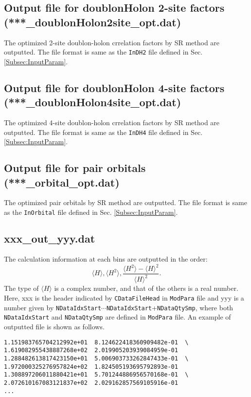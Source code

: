 \subsection{Output file for doublonHolon 2-site factors \\(***\_doublonHolon2site\_opt.dat)}
The optimized 2-site doublon-holon crrelation factors  by SR method are outputted. The file format is same as the \verb|InDH2| file defined in Sec. \ref{Subsec:InputParam}.

\subsection{Output file for doublonHolon 4-site factors \\(***\_doublonHolon4site\_opt.dat)}
The optimized 4-site doublon-holon crrelation factors  by SR method are outputted. The file format is same as the \verb|InDH4| file defined in Sec. \ref{Subsec:InputParam}.

\subsection{Output file for pair orbitals \\(***\_orbital\_opt.dat)}
The optimized pair orbitals by SR method are outputted. The file format is same as the \verb|InOrbital| file defined in Sec. \ref{Subsec:InputParam}.

\subsection{xxx\_out\_yyy.dat}
The calculation information at each bins are outputted in the order:
\begin{equation}
\langle H \rangle, \langle H^2 \rangle, \frac{\langle H^2 \rangle- \langle H \rangle^2 }{\langle H \rangle^2} \nonumber.
\end{equation}
The type of $\langle H \rangle$ is a complex number, and that of the others is a real number.
Here, xxx is the header indicated by \verb|CDataFileHead| in \verb|ModPara| file and yyy is a number given by \verb|NDataIdxStart|$\cdots$\verb|NDataIdxStart|+\verb|NDataQtySmp|, where both \verb|NDataIdxStart| and \verb|NDataQtySmp| are defined in \verb|ModPara| file.
An example of outputted file is shown as follows.

\begin{minipage}{13cm}
\begin{screen}
\begin{verbatim}
1.151983765704212992e+01  8.124622418360909482e-01  \
1.619082955438887268e+02  2.019905203939084959e-01 
1.288482613817423150e+01  5.006903733262847433e-01  \ 
1.972000325276957824e+02  1.824505193695792893e-01
1.308897206011880421e+01  5.701244886956570168e-01  \
2.072610167083121837e+02  2.029162857569105916e-01
...
\end{verbatim}
\end{screen}
\end{minipage}

